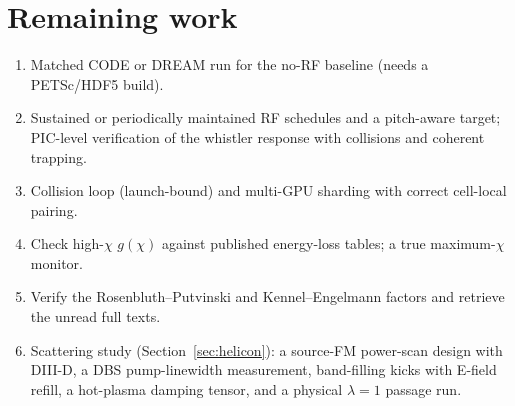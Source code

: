 \documentclass[10pt,a4paper]{article}
\begin{document}
\section{Remaining work}
\begin{enumerate}
\item Matched CODE or DREAM run for the no-RF baseline (needs a PETSc/HDF5 build).
\item Sustained or periodically maintained RF schedules and a pitch-aware target; PIC-level verification of the
whistler response with collisions and coherent trapping.
\item Collision loop (launch-bound) and multi-GPU sharding with correct cell-local pairing.
\item Check high-$\chi$ $g(\chi)$ against published energy-loss tables; a true maximum-$\chi$ monitor.
\item Verify the Rosenbluth--Putvinski and Kennel--Engelmann factors and retrieve the unread full texts.
\item Scattering study (Section~\ref{sec:helicon}): a source-FM power-scan design with DIII-D, a DBS pump-linewidth measurement,
band-filling kicks with E-field refill, a hot-plasma damping tensor, and a physical $\lambda=1$ passage run.
\end{enumerate}
\end{document}
